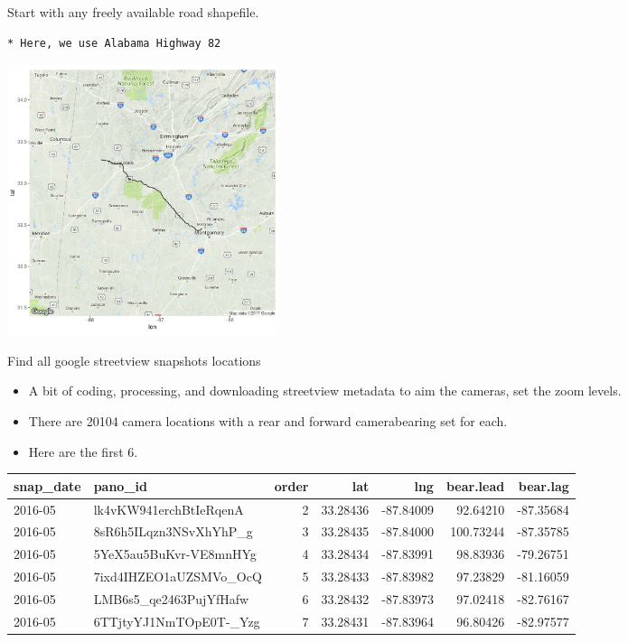\documentclass[ignorenonframetext,]{beamer}
\providecommand{\tightlist}{%
  \setlength{\itemsep}{0pt}\setlength{\parskip}{0pt}}
\begin{document}
\begin{frame}[fragile]{Start with any freely available road shapefile.}

\begin{verbatim}
* Here, we use Alabama Highway 82 
\end{verbatim}

\includegraphics[width=300px]{Images/highway}

\end{frame}

\begin{frame}{Find all google streetview snapshots locations}

\begin{itemize}
\tightlist
\item
  A bit of coding, processing, and downloading streetview metadata to
  aim the cameras, set the zoom levels.
\item
  There are 20104 camera locations with a rear and forward camerabearing
  set for each.
\item
  Here are the first 6.
\end{itemize}

\begin{table}[H]
\centering\begingroup\fontsize{6}{8}\selectfont

\begin{tabular}{l|l|r|r|r|r|r}
\hline
snap\_date & pano\_id & order & lat & lng & bear.lead & bear.lag\\
\hline
2016-05 & lk4vKW941erchBtIeRqenA & 2 & 33.28436 & -87.84009 & 92.64210 & -87.35684\\
\hline
2016-05 & 8sR6h5ILqzn3NSvXhYhP\_g & 3 & 33.28435 & -87.84000 & 100.73244 & -87.35785\\
\hline
2016-05 & 5YeX5au5BuKvr-VE8mnHYg & 4 & 33.28434 & -87.83991 & 98.83936 & -79.26751\\
\hline
2016-05 & 7ixd4IHZEO1aUZSMVo\_OcQ & 5 & 33.28433 & -87.83982 & 97.23829 & -81.16059\\
\hline
2016-05 & LMB6s5\_qe2463PujYfHafw & 6 & 33.28432 & -87.83973 & 97.02418 & -82.76167\\
\hline
2016-05 & 6TTjtyYJ1NmTOpE0T-\_Yzg & 7 & 33.28431 & -87.83964 & 96.80426 & -82.97577\\
\hline
\end{tabular}\endgroup{}
\end{table}

\end{frame}
\end{document}
